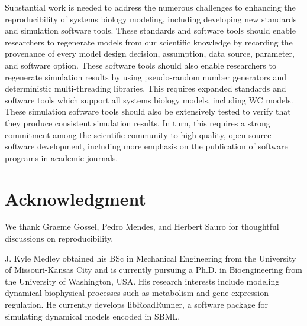 \documentclass[journal,transmag,twoside]{IEEEtran}
\begin{document}
Substantial work is needed to address the numerous challenges to enhancing the reproducibility of systems biology modeling, including developing new standards and simulation software tools. These standards and software tools should enable researchers to regenerate models from our scientific knowledge by recording the provenance of every model design decision, assumption, data source, parameter, and software option. These software tools should also enable researchers to regenerate simulation results by using pseudo-random number generators and deterministic multi-threading libraries. This requires expanded standards and software tools which support all systems biology models, including WC models. These simulation software tools should also be extensively tested to verify that they produce consistent simulation results. In turn, this requires a strong commitment among the scientific community to high-quality, open-source software development, including more emphasis on the publication of software programs in academic journals.

\section{Acknowledgment}

We thank Graeme Gossel, Pedro Mendes, and Herbert Sauro for thoughtful discussions on reproducibility.

\ifCLASSOPTIONcaptionsoff
  \newpage
\fi




\begin{IEEEbiography}{J. Kyle Medley}
obtained his BSc in Mechanical Engineering from the University of Missouri-Kansas City and
is currently pursuing a Ph.D. in Bioengineering from the University of Washington, USA.
His research interests include modeling dynamical biophysical processes such as
metabolism and gene expression regulation.
He currently develops libRoadRunner, a software package for simulating dynamical models encoded in SBML.
\end{IEEEbiography}
\end{document}
